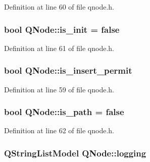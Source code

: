 Definition at line 60 of file qnode.\+h.

\subsubsection[{\texorpdfstring{is\+\_\+init}{is_init}}]{\setlength{\rightskip}{0pt plus 5cm}bool Q\+Node\+::is\+\_\+init = false}\hypertarget{class_q_node_a53a7eeda1a2054b66441bd029976dd33}{}\label{class_q_node_a53a7eeda1a2054b66441bd029976dd33}


Definition at line 61 of file qnode.\+h.

\subsubsection[{\texorpdfstring{is\+\_\+insert\+\_\+permit}{is_insert_permit}}]{\setlength{\rightskip}{0pt plus 5cm}bool Q\+Node\+::is\+\_\+insert\+\_\+permit}\hypertarget{class_q_node_a2bbe086eaeebbc5000e7cd2fd6257043}{}\label{class_q_node_a2bbe086eaeebbc5000e7cd2fd6257043}


Definition at line 59 of file qnode.\+h.

\subsubsection[{\texorpdfstring{is\+\_\+path}{is_path}}]{\setlength{\rightskip}{0pt plus 5cm}bool Q\+Node\+::is\+\_\+path = false}\hypertarget{class_q_node_ae7023e2ee0bf48734c2c2181be96abc7}{}\label{class_q_node_ae7023e2ee0bf48734c2c2181be96abc7}


Definition at line 62 of file qnode.\+h.

\subsubsection[{\texorpdfstring{logging}{logging}}]{\setlength{\rightskip}{0pt plus 5cm}Q\+String\+List\+Model Q\+Node\+::logging\hspace{0.3cm}{\ttfamily [protected]}}\hypertarget{class_q_node_aff2207dadd447d4c2554df19b6f7ce48}{}\label{class_q_node_aff2207dadd447d4c2554df19b6f7ce48}


